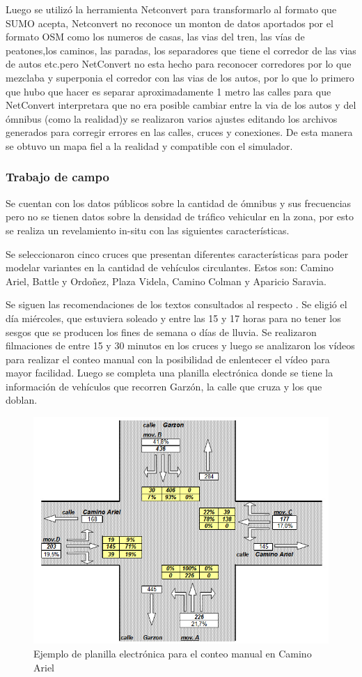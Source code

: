 Luego se utilizó la herramienta Netconvert para transformarlo al formato que SUMO acepta, Netconvert no reconoce un monton de datos aportados por el formato OSM como los numeros de casas, las vias del tren, las vías de peatones,los caminos, las paradas, los separadores que tiene el corredor de las vias de autos etc.pero NetConvert no esta hecho para reconocer corredores por lo que mezclaba y superponia el corredor con las vias de los autos, por lo que lo primero que hubo que hacer es separar aproximadamente 1 metro las calles para que NetConvert interpretara que no era posible cambiar entre la via de los autos y del ómnibus (como la realidad)y se realizaron varios ajustes editando los archivos generados para corregir errores en las calles, cruces y conexiones. De esta manera se obtuvo un mapa fiel a la realidad y compatible con el simulador.


\subsubsection{Trabajo de campo}
Se cuentan con los datos públicos sobre la cantidad de  ómnibus y sus frecuencias pero no se tienen datos sobre la densidad de tráfico vehicular en la zona, por esto se realiza un revelamiento in-situ con las siguientes características.

Se seleccionaron cinco cruces que presentan diferentes características para poder modelar variantes en la cantidad de vehículos circulantes.
Estos son: Camino Ariel, Battle y Ordoñez, Plaza Videla, Camino Colman y Aparicio Saravia. 

Se siguen las recomendaciones de los textos consultados al respecto \citep{ConteoTrafico}. Se eligió el día miércoles, que estuviera soleado y entre las 15 y 17 horas para no tener los sesgos que se producen los fines de semana o días de lluvia.
Se realizaron filmaciones de entre 15 y 30 minutos en los cruces y luego se analizaron los vídeos para realizar el conteo manual con la posibilidad de enlentecer el vídeo para mayor facilidad. Luego se completa una planilla electrónica donde se tiene la información de vehículos que recorren Garzón, la calle que cruza y los que doblan. 

\begin{figure}[H]
	\centering
	\includegraphics[width=0.7\linewidth]{Figures/conteo_hoja}
	\caption{Ejemplo de planilla electrónica para el conteo manual en Camino Ariel}
	\label{fig:conteo_hoja}
\end{figure}



